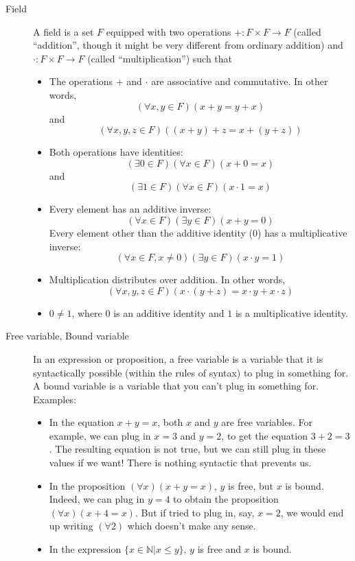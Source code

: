 \documentclass[12pt]{article}
\begin{document}
\begin{description}
  \item[Field] A field is a set $F$ equipped with two operations
    $+:F\times F\rightarrow F$ (called ``addition'', though it might
    be very different from ordinary addition) and $\cdot:F\times
    F\rightarrow F$ (called ``multiplication'') such that
    \begin{itemize}
    \item The operations $+$ and $\cdot$ are associative and
      commutative. In other words,
      $$(\forall x,y\in F) (x+y=y+x)$$
      and
      $$(\forall x,y,z\in F) ((x+y)+z=x+(y+z)) $$
    \item Both operations have identities:
      $$(\exists 0\in F)(\forall x\in F) (x+0=x)$$
      and
      $$(\exists 1\in F)(\forall x\in F) (x\cdot 1=x)$$
    \item Every element has an additive inverse:
      $$(\forall x\in F)(\exists y\in F)(x+y=0)$$ Every element other
      than the additive identity ($0$) has a multiplicative inverse:
      $$(\forall x\in F,x\neq 0) (\exists y\in F)(x\cdot y=1)$$
    \item Multiplication distributes over addition.  In
      other words,
      $$(\forall x,y,z\in F) (x\cdot (y+z)=x\cdot y + x\cdot z)$$
    \item $0\neq 1$, where $0$ is an additive identity and $1$ is a
      multiplicative identity.
    \end{itemize}

  \item[Free variable, Bound variable] In an expression or
    proposition, a free variable is a variable that it is
    syntactically possible (within the rules of syntax) to plug in
    something for.  A bound variable is a variable that you can't plug
    in something for.  Examples:
    \begin{itemize}
      \item In the equation $x+y=x$, both $x$ and $y$ are free
        variables.  For example, we can plug in $x=3$ and $y=2$, to
        get the equation $3+2=3$.  The resulting equation is not true,
        but we can still plug in these values if we want!  There is
        nothing syntactic that prevents us.
      \item In the proposition $(\forall x)(x+y=x)$, $y$ is free, but
        $x$ is bound.  Indeed, we can plug in $y=4$ to obtain the
        proposition $(\forall x)(x+4=x)$.  But if tried to plug in,
        say, $x=2$, we would end up writing $(\forall 2)$ which
        doesn't make any sense.
      \item In the expression $\{x\in\mathbb{N}|x\leq y\}$, $y$ is
        free and $x$ is bound.
    \end{itemize}
    

\end{description}
\end{document}
